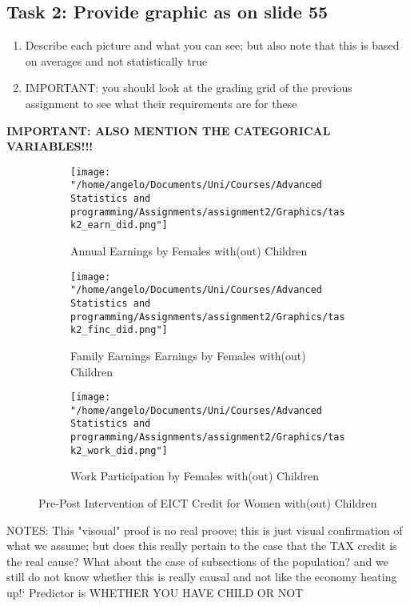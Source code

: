 \documentclass[a4paper]{article}
\begin{document}
\subsection{Task 2: Provide graphic as on slide 55}

\begin{enumerate}
   \item Describe each picture and what you can see; but also note that this is based on averages and not statistically true
   \item IMPORTANT: you should look at the grading grid of the previous assignment to see what their requirements are for these
\end{enumerate}

\textbf{IMPORTANT: ALSO MENTION THE CATEGORICAL VARIABLES!!!}


\begin{wrapfigure}{L}{9cm}
\centering
\begin{subfigure}[b]{0.5\textwidth}
    \texttt{[image: "/home/angelo/Documents/Uni/Courses/Advanced Statistics and programming/Assignments/assignment2/Graphics/task2\_earn\_did.png"]} 
   \caption{Annual Earnings by Females with(out) Children}
   \label{fig:Ng2}
\end{subfigure}

\begin{subfigure}[b]{0.5\textwidth}
    \texttt{[image: "/home/angelo/Documents/Uni/Courses/Advanced Statistics and programming/Assignments/assignment2/Graphics/task2\_finc\_did.png"]} 
   \caption{Family Earnings Earnings by Females with(out) Children}
   \label{fig:Ng2}
\end{subfigure}

\begin{subfigure}[b]{0.5\textwidth}
    \texttt{[image: "/home/angelo/Documents/Uni/Courses/Advanced Statistics and programming/Assignments/assignment2/Graphics/task2\_work\_did.png"]}  
   \caption{Work Participation by Females with(out) Children}
   \label{fig:Ng2}
\end{subfigure}
\captionsetup{justification=centering}
\caption{Pre-Post Intervention of EICT Credit for Women with(out) Children}
\end{wrapfigure}





NOTES: This "visoual" proof is no real proove; this is just visual confirmation of what we assume; but does this really pertain to the case that the TAX credit is the real cause? What about the case of subsections of the population? and we still do not know whether this is really causal and not like the economy heating up!`
Predictor is WHETHER YOU HAVE CHILD OR NOT
\end{document}
